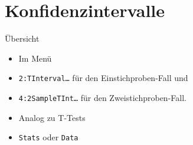 \documentclass{beamer}
\newlength{\tikey}
\newcommand{\keystroke}[1]{\settowidth{\tikey}{\scriptsize #1}\psframebox[framearc=0.2]{\parbox{\tikey}{\scriptsize #1}}}
\begin{document}
%
%

\section[KI]{Konfidenzintervalle}
\begin{frame}{Übersicht}
\begin{itemize}
\item Im Menü \keystroke{F7}
\item \texttt{2:TInterval\ldots} für den Einstichproben-Fall und
\item \texttt{4:2SampleTInt\ldots} für den Zweistichproben-Fall.
\item Analog zu T-Tests
\item \texttt{Stats} oder \texttt{Data}
\end{itemize}
\end{frame}
\end{document}
